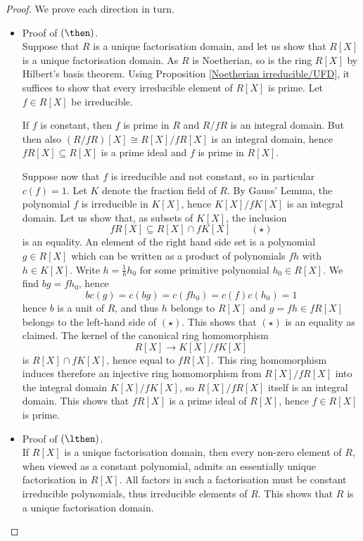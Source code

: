 \documentclass[12pt, a4paper]{article}
\begin{document}
\begin{proof}
    We prove each direction in turn.
    \begin{itemize}
        \item Proof of \((\then)\).\\
        Suppose that \( R \) is a unique factorisation domain, and let us show that \( R[X] \) is a unique factorisation domain. As \( R \) is Noetherian, so is the ring \( R[X] \) by Hilbert's basis theorem. Using Proposition \ref{Noetherian irreducible/UFD}, it suffices to show that every irreducible element of \( R[X] \) is prime. Let \( f \in R[X] \) be irreducible.

        If \( f \) is constant, then \( f \) is prime in \( R \) and \( R/fR \) is an integral domain. But then also \( (R/fR)[X] \cong R[X]/fR[X] \) is an integral domain, hence \( fR[X] \subseteq R[X] \) is a prime ideal and \( f \) is prime in \( R[X] \).

        Suppose now that \( f \) is irreducible and not constant, so in particular \( c(f) = 1 \). Let \( K \) denote the fraction field of \( R \). By Gauss' Lemma, the polynomial \( f \) is irreducible in \( K[X] \), hence \( K[X]/fK[X] \) is an integral domain. Let us show that, as subsets of \( K[X] \), the inclusion
        \[
        fR[X] \subseteq R[X] \cap fK[X] \qquad (\star)
        \]
        is an equality. An element of the right hand side set is a polynomial \( g \in R[X] \) which can be written as a product of polynomials \( fh \) with \( h \in K[X] \). Write \( h = \frac{1}{b}h_0 \) for some primitive polynomial \( h_0 \in R[X] \). We find \( bg = fh_0 \), hence
        \[
        bc(g) = c(bg) = c(fh_0) = c(f)c(h_0) = 1
        \]
        hence \( b \) is a unit of \( R \), and thus \( h \) belongs to \( R[X] \) and \( g = fh \in fR[X] \) belongs to the left-hand side of \((\star)\). This shows that \((\star)\) is an equality as claimed. The kernel of the canonical ring homomorphism
        \[
        R[X] \to K[X]/fK[X]
        \]
        is \( R[X] \cap fK[X] \), hence equal to \( fR[X] \). This ring homomorphism induces therefore an injective ring homomorphism from \( R[X]/fR[X] \) into the integral domain \( K[X]/fK[X] \), so \( R[X]/fR[X] \) itself is an integral domain. This shows that \( fR[X] \) is a prime ideal of \( R[X] \), hence \( f \in R[X] \) is prime. 
        \item Proof of \((\lthen)\). \\
        If \( R[X] \) is a unique factorisation domain, then every non-zero element of \( R \), when viewed as a constant polynomial, admits an essentially unique factorisation in \( R[X] \). All factors in such a factorisation must be constant irreducible polynomials, thus irreducible elements of \( R \). This shows that \( R \) is a unique factorisation domain.
    \end{itemize}
\end{proof}
\end{document}
